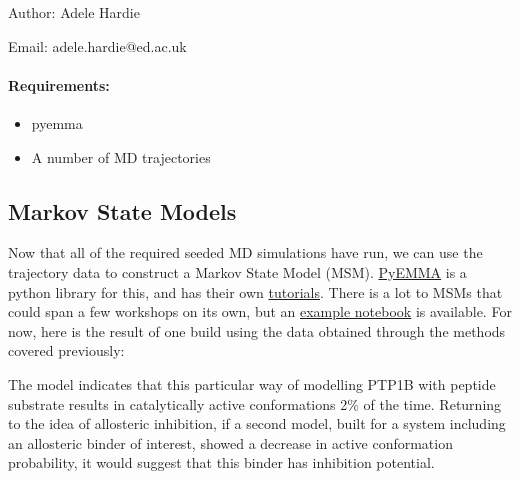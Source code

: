 Author: Adele Hardie

Email: adele.hardie@ed.ac.uk

\hypertarget{requirements}{%
\paragraph{Requirements:}\label{requirements}}

\begin{itemize}
\tightlist
\item
  pyemma
\item
  A number of MD trajectories
\end{itemize}

\hypertarget{markov-state-models}{%
\subsection{Markov State Models}\label{markov-state-models}}

Now that all of the required seeded MD simulations have run, we can use
the trajectory data to construct a Markov State Model (MSM).
\href{http://emma-project.org/latest/}{PyEMMA} is a python library for
this, and has their own
\href{http://emma-project.org/latest/tutorial.html}{tutorials}. There is
a lot to MSMs that could span a few workshops on its own, but an
\href{03_msm_full.ipynb}{example notebook} is available. For now, here
is the result of one build using the data obtained through the methods
covered previously:

The model indicates that this particular way of modelling PTP1B with
peptide substrate results in catalytically active conformations 2\% of
the time. Returning to the idea of allosteric inhibition, if a second
model, built for a system including an allosteric binder of interest,
showed a decrease in active conformation probability, it would suggest
that this binder has inhibition potential.
